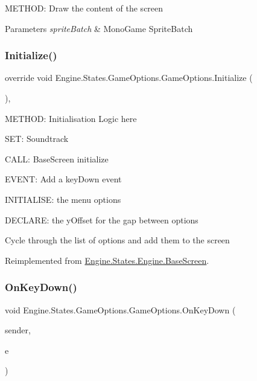 M\+E\+T\+H\+OD\+: Draw the content of the screen 


\begin{DoxyParams}{Parameters}
{\em sprite\+Batch} & Mono\+Game Sprite\+Batch\\
\hline
\end{DoxyParams}
\mbox{\label{a00558_a1547a699546baa41aa39a2e2b4412787}} 
\subsubsection{\texorpdfstring{Initialize()}{Initialize()}}
{\footnotesize\ttfamily override void Engine.\+States.\+Game\+Options.\+Game\+Options.\+Initialize (\begin{DoxyParamCaption}{ }\end{DoxyParamCaption})\hspace{0.3cm}{\ttfamily [inline]}, {\ttfamily [virtual]}}



M\+E\+T\+H\+OD\+: Initialisation Logic here 

S\+ET\+: Soundtrack

C\+A\+LL\+: Base\+Screen initialize

E\+V\+E\+NT\+: Add a key\+Down event

I\+N\+I\+T\+I\+A\+L\+I\+SE\+: the menu options

D\+E\+C\+L\+A\+RE\+: the y\+Offset for the gap between options

Cycle through the list of options and add them to the screen 

Reimplemented from \hyperlink{a00550_af8fd6890abf865641e190578ef2e054c}{Engine.\+States.\+Engine.\+Base\+Screen}.

\mbox{\label{a00558_a595552ae004bb6c7d5d42605c1c5d239}} 
\subsubsection{\texorpdfstring{On\+Key\+Down()}{OnKeyDown()}}
{\footnotesize\ttfamily void Engine.\+States.\+Game\+Options.\+Game\+Options.\+On\+Key\+Down (\begin{DoxyParamCaption}\item[{object}]{sender,  }\item[{\hyperlink{a00362}{Key\+Event\+Args}}]{e }\end{DoxyParamCaption})\hspace{0.3cm}{\ttfamily [inline]}}



